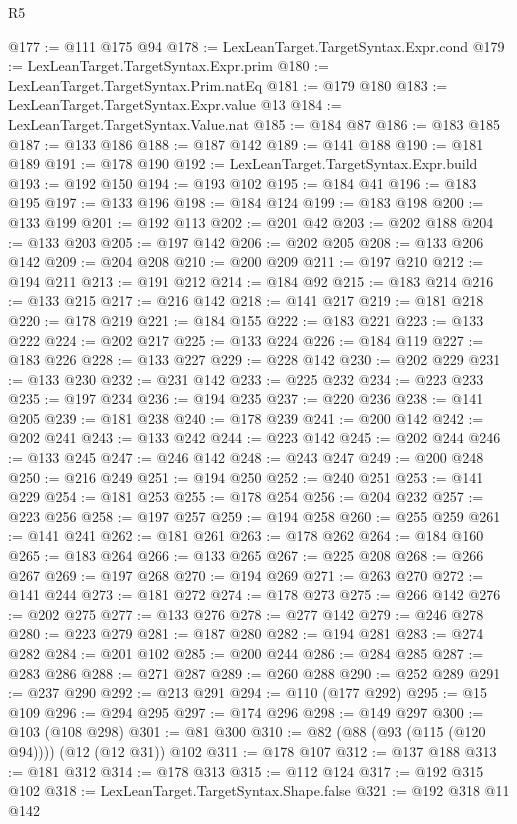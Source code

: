 \begin{lexlean}{R5}
\begin{coremodule}
@177 := @111 @175 @94
@178 := LexLeanTarget.TargetSyntax.Expr.cond
@179 := LexLeanTarget.TargetSyntax.Expr.prim
@180 := LexLeanTarget.TargetSyntax.Prim.natEq
@181 := @179 @180
@183 := LexLeanTarget.TargetSyntax.Expr.value @13
@184 := LexLeanTarget.TargetSyntax.Value.nat
@185 := @184 @87
@186 := @183 @185
@187 := @133 @186
@188 := @187 @142
@189 := @141 @188
@190 := @181 @189
@191 := @178 @190
@192 := LexLeanTarget.TargetSyntax.Expr.build
@193 := @192 @150
@194 := @193 @102
@195 := @184 @41
@196 := @183 @195
@197 := @133 @196
@198 := @184 @124
@199 := @183 @198
@200 := @133 @199
@201 := @192 @113
@202 := @201 @42
@203 := @202 @188
@204 := @133 @203
@205 := @197 @142
@206 := @202 @205
@208 := @133 @206 @142
@209 := @204 @208
@210 := @200 @209
@211 := @197 @210
@212 := @194 @211
@213 := @191 @212
@214 := @184 @92
@215 := @183 @214
@216 := @133 @215
@217 := @216 @142
@218 := @141 @217
@219 := @181 @218
@220 := @178 @219
@221 := @184 @155
@222 := @183 @221
@223 := @133 @222
@224 := @202 @217
@225 := @133 @224
@226 := @184 @119
@227 := @183 @226
@228 := @133 @227
@229 := @228 @142
@230 := @202 @229
@231 := @133 @230
@232 := @231 @142
@233 := @225 @232
@234 := @223 @233
@235 := @197 @234
@236 := @194 @235
@237 := @220 @236
@238 := @141 @205
@239 := @181 @238
@240 := @178 @239
@241 := @200 @142
@242 := @202 @241
@243 := @133 @242
@244 := @223 @142
@245 := @202 @244
@246 := @133 @245
@247 := @246 @142
@248 := @243 @247
@249 := @200 @248
@250 := @216 @249
@251 := @194 @250
@252 := @240 @251
@253 := @141 @229
@254 := @181 @253
@255 := @178 @254
@256 := @204 @232
@257 := @223 @256
@258 := @197 @257
@259 := @194 @258
@260 := @255 @259
@261 := @141 @241
@262 := @181 @261
@263 := @178 @262
@264 := @184 @160
@265 := @183 @264
@266 := @133 @265
@267 := @225 @208
@268 := @266 @267
@269 := @197 @268
@270 := @194 @269
@271 := @263 @270
@272 := @141 @244
@273 := @181 @272
@274 := @178 @273
@275 := @266 @142
@276 := @202 @275
@277 := @133 @276
@278 := @277 @142
@279 := @246 @278
@280 := @223 @279
@281 := @187 @280
@282 := @194 @281
@283 := @274 @282
@284 := @201 @102
@285 := @200 @244
@286 := @284 @285
@287 := @283 @286
@288 := @271 @287
@289 := @260 @288
@290 := @252 @289
@291 := @237 @290
@292 := @213 @291
@294 := @110 (@177 @292)
@295 := @15 @109
@296 := @294 @295
@297 := @174 @296
@298 := @149 @297
@300 := @103 (@108 @298)
@301 := @81 @300
@310 := @82 (@88 (@93 (@115 (@120 @94)))) (@12 (@12 @31)) @102
@311 := @178 @107
@312 := @137 @188
@313 := @181 @312
@314 := @178 @313
@315 := @112 @124
@317 := @192 @315 @102
@318 := LexLeanTarget.TargetSyntax.Shape.false
@321 := @192 @318 @11 @142

\end{coremodule}
\end{lexlean}

